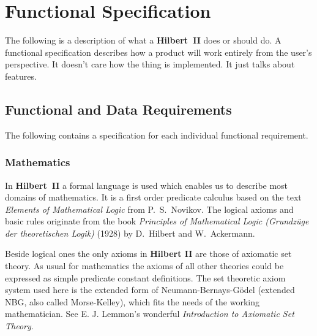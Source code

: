 \documentclass[a4paper,german,10pt,twoside]{book}
\theoremstyle{definition}
\theoremstyle{remark}
\begin{document}

\chapter{Functional Specification\label{ch:functional.specification}} \label{chapter3} \hypertarget{chapter3}{}

The following is a description of what a \textbf{Hilbert~II} does or should do.
A functional specification describes how a product will work entirely from the user's perspective. It doesn't care how the thing is implemented. It just talks about features.

\section{Functional and Data Requirements} \label{chapter3_section0} \hypertarget{chapter3_section0}{}
The following contains a specification for each individual functional requirement.

\subsection{Mathematics\label{mathematics}
}
In \textbf{Hilbert~II} a formal language is used which enables us to describe most domains of mathematics. It is a first order predicate calculus based on the text \emph{Elements of Mathematical Logic} from P.~S.~Novikov. The logical axioms and basic rules originate from the book \emph{Principles of Mathematical Logic (Grundz{\"u}ge der theoretischen Logik)} (1928) by D.~Hilbert and W.~Ackermann.
\par
Beside logical ones the only axioms in \textbf{Hilbert II} are those of axiomatic set theory. As usual for mathematics the axioms of all other theories could be expressed as simple predicate constant definitions. The set theoretic axiom system used here is the extended form of Neumann-Bernays-G{\"o}del (extended NBG, also called Morse-Kelley), which fits the needs of the working mathematician. See  E. J. Lemmon's wonderful \emph{Introduction to Axiomatic Set Theory}.
\end{document}
